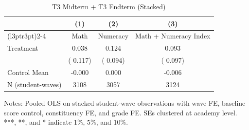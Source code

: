\begin{table}[!htbp]
\centering
\caption{T3 Midterm + T3 Endterm (Stacked)}
\label{tab:ng_t3_over_time}
\begin{threeparttable}
\begin{tabular}[t]{lccc}
\toprule
 & (1) & (2) & (3) \\
\cmidrule(l{3pt}r{3pt}){2-4}
 & Math & Numeracy & Math + Numeracy Index \\
\midrule
Treatment &   0.038 &   0.124 &   0.093 \\
 & (  0.117) & (  0.094) & (  0.097) \\
\addlinespace
Control Mean &  -0.000 &   0.000 &  -0.006 \\
N (student-waves) & 3108 & 3057 & 3124 \\
\bottomrule
\end{tabular}
\begin{tablenotes}[para]
\item Notes: Pooled OLS on stacked student-wave observations with wave FE, 
baseline score control, constituency FE, and grade FE. 
SEs clustered at academy level. ***, **, and * indicate 1\%, 5\%, and 10\%.
\end{tablenotes}
\end{threeparttable}
\end{table}
